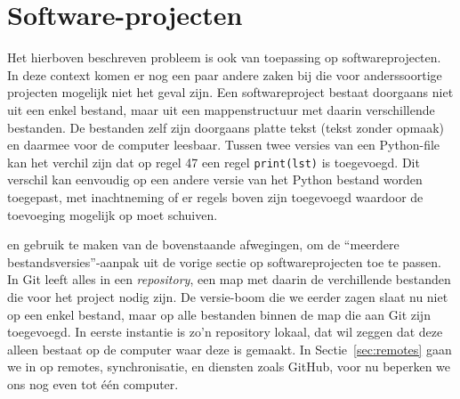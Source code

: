 \section{Software-projecten}
Het hierboven beschreven probleem is ook van toepassing op softwareprojecten. In deze context komen er nog een paar andere zaken bij die voor anderssoortige projecten mogelijk niet het geval zijn. Een softwareproject bestaat doorgaans niet uit een enkel bestand, maar uit een mappenstructuur met daarin verschillende bestanden. De bestanden zelf zijn doorgaans platte tekst (tekst zonder opmaak) en daarmee voor de computer leesbaar. Tussen twee versies van een Python-file kan het verchil zijn dat op regel 47 een regel \texttt{print(lst)} is toegevoegd. Dit verschil kan eenvoudig op een andere versie van het Python bestand worden toegepast, met inachtneming of er regels boven zijn toegevoegd waardoor de toevoeging mogelijk op moet schuiven. 

 en gebruik te maken van de bovenstaande afwegingen, om de \enquote{meerdere bestandsversies}-aanpak uit de vorige sectie op softwareprojecten toe te passen. In Git leeft alles in een \emph{repository}, een map met daarin de verchillende bestanden die voor het project nodig zijn. De versie-boom die we eerder zagen slaat nu niet op een enkel bestand, maar op alle bestanden binnen de map die aan Git zijn toegevoegd. In eerste instantie is zo'n repository lokaal, dat wil zeggen dat deze alleen bestaat op de computer waar deze is gemaakt. In Sectie~\ref{sec:remotes} gaan we in op remotes, synchronisatie, en diensten zoals GitHub, voor nu beperken we ons nog even tot \'e\'en computer.

